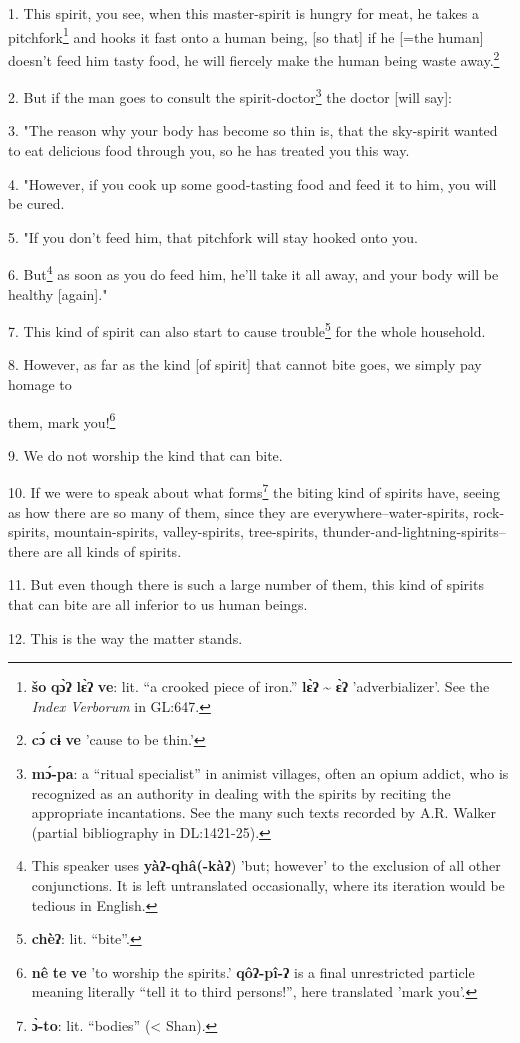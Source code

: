 \setcounter{footnote}{0}


1. This spirit, you see, when this master-spirit is hungry for meat, he takes a
pitchfork\footnote{\textbf{šo} \textbf{qɔ̀ʔ} \textbf{lɛ̀ʔ} \textbf{ve}: lit. ``a crooked piece of iron.'' \textbf{lɛ̀ʔ} \textasciitilde{} \textbf{ɛ̀ʔ} 'adverbializer'. See the \textit{Index Verborum} in GL:647.} and hooks it fast onto a human being, [so that] if he [=the human]
doesn't feed him tasty food, he will fiercely make the human being waste away.\footnote{\textbf{cɔ́} \textbf{cɨ} \textbf{ve} 'cause to be thin.'}

2. But if the man goes to consult the spirit-doctor\footnote{\textbf{mɔ́-pa}: a ``ritual specialist'' in animist villages, often an opium addict, who is recognized as an authority in dealing with the spirits by reciting the appropriate incantations. See the many such texts recorded by A.R. Walker (partial bibliography in DL:1421-25).} the doctor [will say]:

3. "The reason why your body has become so thin is, that the sky-spirit
wanted to eat delicious food through you, so he has treated you this way.

4. "However, if you cook up some good-tasting food and feed it to him,
you will be cured.

5. "If you don't feed him, that pitchfork will stay hooked onto you.

6. But\footnote{This speaker uses \textbf{yàʔ-qhâ(-kàʔ}) 'but; however' to the exclusion of all other conjunctions. It is left untranslated occasionally, where its iteration would be tedious in English.} as soon as you do feed him, he'll take it all away, and your body will
be healthy [again]."

7. This kind of spirit can also start to cause trouble\footnote{\textbf{chèʔ}: lit. ``bite''.} for the whole household.

8. However, as far as the kind [of spirit] that cannot bite goes, we simply pay
homage to

them, mark you!\footnote{\textbf{nê} \textbf{te} \textbf{ve} 'to worship the spirits.' \textbf{qôʔ-pî-ʔ} is a final unrestricted particle meaning literally ``tell it to third persons!'', here translated 'mark you'.}

9. We do not worship the kind that can bite.

10. If we were to speak about what forms\footnote{\textbf{ɔ̀-to}: lit. ``bodies'' (< Shan).} the biting kind of spirits have, seeing
as how there are so many of them, since they are everywhere--water-spirits, rock-spirits,
mountain-spirits, valley-spirits, tree-spirits, thunder-and-lightning-spirits--there
are all kinds of spirits.

11. But even though there is such a large number of them, this kind of spirits
that can bite are all inferior to us human beings.

12. This is the way the matter stands.

